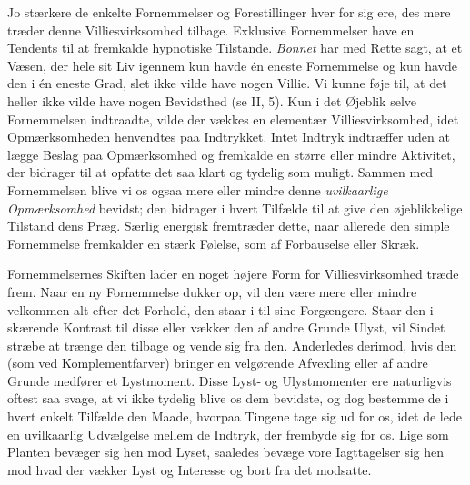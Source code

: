 \documentclass[12pt,a4paper,openany]{book}
\newcommand{\opage}[1]{\marginnote{\footnotesize\textit{[#1]}}}
\begin{document}
Jo stærkere de enkelte Fornemmelser og Forestillinger hver for sig ere,
des mere træder denne Villiesvirksomhed tilbage. Exklusive Fornemmelser
have en Tendents til at fremkalde hypnotiske Tilstande. \emph{Bonnet}
har med Rette sagt, at et Væsen, der hele sit Liv igennem kun havde én
eneste Fornemmelse og kun havde den i én eneste Grad, slet ikke
\opage{372}vilde have nogen Villie. Vi kunne føje til, at det heller
ikke vilde have nogen Bevidsthed (se II, 5). Kun i det Øjeblik selve
Fornemmelsen indtraadte, vilde der vækkes en elementær
Villiesvirksomhed, idet Opmærksomheden henvendtes paa Indtrykket. Intet
Indtryk indtræffer uden at lægge Beslag paa Opmærksomhed og fremkalde en
større eller mindre Aktivitet, der bidrager til at opfatte det saa klart
og tydelig som muligt. Sammen med Fornemmelsen blive vi os ogsaa mere
eller mindre denne \emph{uvilkaarlige Opmærksomhed} bevidst; den
bidrager i hvert Tilfælde til at give den øjeblikkelige Tilstand dens
Præg. Særlig energisk fremtræder dette, naar allerede den simple
Fornemmelse fremkalder en stærk Følelse, som af Forbauselse eller Skræk.

Fornemmelsernes Skiften lader en noget højere Form for Villiesvirksomhed
træde frem. Naar en ny Fornemmelse dukker op, vil den være mere eller
mindre velkommen alt efter det Forhold, den staar i til sine Forgængere.
Staar den i skærende Kontrast til disse eller vækker den af andre Grunde
Ulyst, vil Sindet stræbe at trænge den tilbage og vende sig fra den.
Anderledes derimod, hvis den (som ved Komplementfarver) bringer en
velgørende Afvexling eller af andre Grunde medfører et Lystmoment. Disse
Lyst- og Ulystmomenter ere naturligvis oftest saa svage, at vi ikke
tydelig blive os dem bevidste, og dog bestemme de i hvert enkelt
Tilfælde den Maade, hvorpaa Tingene tage sig ud for os, idet de lede en
uvilkaarlig Udvælgelse mellem de Indtryk, der frembyde sig for os. Lige
som Planten bevæger sig hen mod Lyset, saaledes bevæge vore Iagttagelser
sig hen mod hvad der vækker Lyst og Interesse og bort fra det modsatte.
\end{document}
